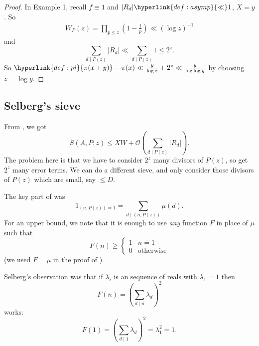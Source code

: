 \documentclass{article}
\newcommand{\1}{\mathbbm{1}}
\newcommand{\bigO}{\mathcal{O}}
\begin{document}
\begin{proof}
  In Example 1, recall $f \equiv 1$ and $|R_d| \hyperlink{def:asymp}{\ll} 1$, $X = y$.
  So
  \begin{align*}
    W_P(z) = \prod_{p \leq z} \left(1 - \frac 1p\right) \ll (\log z)^{-1}
  \end{align*}
  and
  \begin{equation*}
    \sum_{d \mid P(z)} |R_d| \ll \sum_{d \mid P(z)} 1 \leq 2^z.
  \end{equation*}
  So $\hyperlink{def:pi}{\pi(x+y)} - \pi(x) \ll \frac{y}{\log z} + 2^z \ll \frac{y}{\log \log y} $ by choosing $z = \log y$.
\end{proof}

\subsection{Selberg's sieve}
\newlec
From , we got
\begin{equation*}
  S(A,P;z) \leq XW + \bigO\left(\sum_{d \mid P(z)} |R_d|\right).
\end{equation*}
The problem here is that we have to consider $2^z$ many divisors of $P(z)$, so get $2^z$ many error terms.
We can do a different sieve, and only consider those divisors of $P(z)$ which are small, say $\leq D$.

The key part of  was
\begin{equation*}
  1_{(n,P(z)) = 1} = \sum_{d \mid (n, P(z))} \mu(d).
\end{equation*}
For an upper bound, we note that it is enough to use \emph{any} function $F$ in place of $\mu$ such that
\begin{equation*}
  F(n) \geq
  \begin{cases}
    1 & n=1 \\
    0 & \text{otherwise}
  \end{cases}
\end{equation*}
(we used $F=\mu$ in the proof of )

Selberg's observation was that if $\lambda_i$ is an sequence of reals with $\lambda_1 = 1$ then
\begin{equation*}
  F(n) = \left(\sum_{d \mid n} \lambda_d\right)^2
\end{equation*}
works:
\begin{equation*}
  F(1) = \left(\sum_{d \mid 1} \lambda_d\right)^2 = \lambda_1^2 = 1.
\end{equation*}
\end{document}
